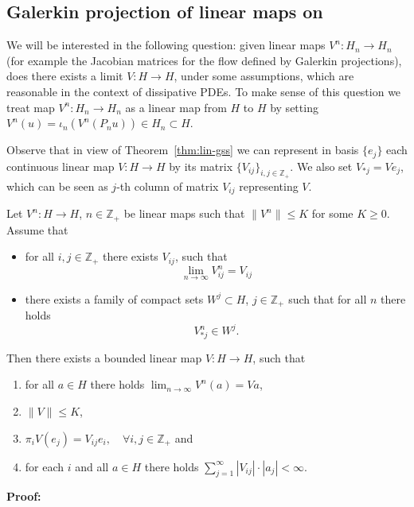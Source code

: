 
\subsection{Galerkin projection of linear maps on \gss}

We will be interested in the following question: given linear maps $V^n: H_n \to H_n$ (for example the Jacobian matrices for the flow defined by Galerkin projections), does there exists a limit $V:H \to H$, under some assumptions, which  are reasonable in the context of dissipative PDEs.  To make sense of this question we treat map  $V^n:H_n \to H_n$  as a linear map from $H$ to $H$ by setting
$V^n(u)= \iota_n (V^n(P_n u)) \in H_n \subset H$.


Observe that in view of Theorem~\ref{thm:lin-gss} we can represent in basis $\{e_j\}$ each continuous linear map $V:H \to H$ by its matrix $\{V_{ij}\}_{i,j \in \mathbb{Z}_+}$. 
We also set $V_{*j}=Ve_j$, which can be seen as $j$-th column of matrix $V_{ij}$ representing $V$.



\begin{theorem}
\label{thm:Vn-weak-lim}
 Let $V^n:H \to H$, $n\in\mathbb Z_+$ be linear maps such that $\|V^n\| \leq K$ for some $K\geq 0$. Assume that
 \begin{itemize}
 \item for all $i,j \in \mathbb{Z}_+$ there exists $V_{ij}$, such that
 \begin{equation}
   \lim_{n\to \infty} V^n_{ij} = V_{ij} \label{eq:dfg-Vij-conv0}
 \end{equation}
 \item there exists a family of compact sets $W^j\subset H$, $j\in\mathbb Z_+$ such that for all $n$ there holds
 \begin{equation}
 V^n_{\ast j} \in W^j. \label{eq:Vnj-approribnd}
 \end{equation}
\end{itemize}

Then there exists a bounded linear map $V:H\to H$, such that
\begin{enumerate}
\item  for all $a \in H$ there holds $\lim_{n \to \infty} V^n(a)=Va$,
\item $\|V\| \leq K$,
\item  $\pi_iV(e_j)= V_{ij} e_i, \quad \forall i,j\in \mathbb{Z}_+$ and
\item for each $i$ and all $a \in H$ there holds $\sum_{j=1}^\infty |V_{ij}| \cdot |a_j| < \infty$.
\end{enumerate}
\end{theorem}
\textbf{Proof:}

